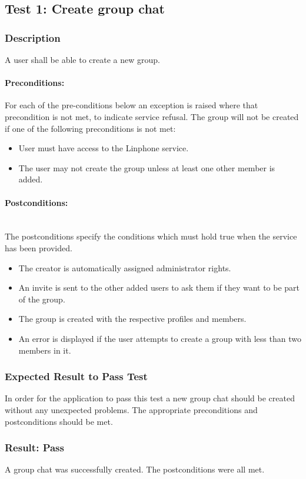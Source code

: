\documentclass[11pt]{article}
\begin{document}
\subsection{Test 1: Create group chat}
\subsubsection{Description}
A user shall be able to create a new group.\\
\paragraph{Preconditions:}
For each of the pre-conditions below an exception is raised where that precondition is not met, to indicate service refusal.
The group will not be created if one of the following preconditions is not met:
\begin{itemize}
\item User must have access to the Linphone service.
\item The user may not create the group unless at least one other member is added.
\end{itemize}
\paragraph{Postconditions:} \\
The postconditions specify the conditions which must hold true when the service has been provided.
\begin{itemize}
\item The creator is automatically assigned administrator rights.
\item An invite is sent to the other added users to ask them if they want to be part of the group.
\item The group is created with the respective profiles and members.
\item An error is displayed if the user attempts to create a group with less than two members in it.
\end{itemize}

\subsubsection{Expected Result to Pass Test}
In order for the application to pass this test a new group chat should be created without any unexpected problems. The appropriate preconditions and postconditions should be met.
\subsubsection{Result: Pass}
A group chat was successfully created. The postconditions were all met.
\end{document}

